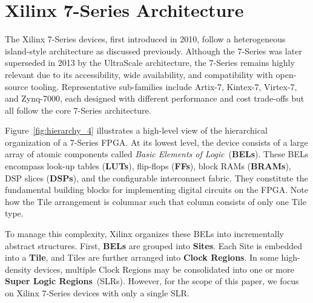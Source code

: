 \section{Xilinx 7-Series Architecture}
\label{sec:7_series}
The Xilinx 7-Series devices, first introduced in 2010, follow a heterogeneous island-style architecture as discussed previously. 
Although the 7-Series was later superseded in 2013 by the UltraScale architecture, the 7-Series remains highly relevant due to its accessibility, wide availability, and compatibility with open-source tooling. 
Representative sub-families include Artix-7, Kintex-7, Virtex-7, and Zynq-7000, each designed with different performance and cost trade-offs but all follow the core 7-Series architecture.


Figure~\ref{fig:hierarchy_4} illustrates a high-level view of the hierarchical organization of a 7-Series FPGA. 
At its lowest level, the device consists of a large array of atomic components called \emph{Basic Elements of Logic}~(\textbf{BELs}). 
These BELs encompass look-up tables (\textbf{LUTs}), flip-flops (\textbf{FFs}), block RAMs (\textbf{BRAMs}), DSP slices (\textbf{DSPs}), and the configurable interconnect fabric. 
They constitute the fundamental building blocks for implementing digital circuits on the FPGA.
Note how the Tile arrangement is columnar such that column consists of only one Tile type. 

To manage this complexity, Xilinx organizes these BELs into incrementally abstract structures. 
First, \textbf{BELs} are grouped into \textbf{Sites}. 
Each Site is embedded into a \textbf{Tile}, and Tiles are further arranged into \textbf{Clock Regions}. 
In some high-density devices, multiple Clock Regions may be consolidated into one or more \textbf{Super Logic Regions}~(SLRs). 
However, for the scope of this paper, we focus on Xilinx 7-Series devices with only a single SLR.

